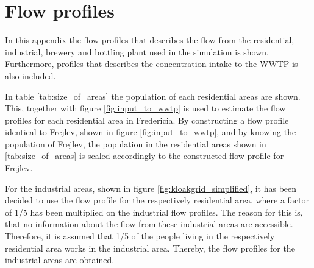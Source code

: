 \newpage
\section{Flow profiles}\label{app:flow_profiles}
In this appendix the flow profiles that describes the flow from the residential, industrial, brewery and bottling plant used in the simulation is shown. Furthermore, profiles that describes the concentration intake to the WWTP is also included.

In table \ref{tab:size_of_areas} the population of each residential areas are shown. This, together with figure \ref{fig:input_to_wwtp} is used to estimate the flow profiles for each residential area in Fredericia. By constructing a flow profile identical to Frejlev, shown in figure \ref{fig:input_to_wwtp}, and by knowing the population of Frejlev, the population in the residential areas shown in \ref{tab:size_of_areas} is scaled accordingly to the constructed flow profile for Frejlev.

For the industrial areas, shown in figure \ref{fig:kloakgrid_simplified}, it has been decided to use the flow profile for the respectively residential area, where a factor of 1/5 has been multiplied on the industrial flow profiles. The reason for this is, that no information about the flow from these industrial areas are accessible. Therefore, it is assumed that 1/5 of the people living in the respectively residential area works in the industrial area. Thereby, the flow profiles for the industrial areas are obtained.

